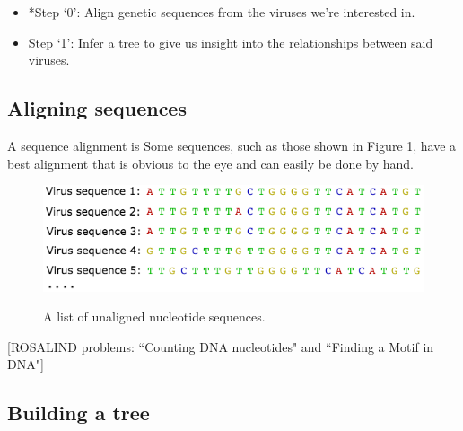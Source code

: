\documentclass{scrartcl}
\begin{document}
\begin{itemize}
	\item *Step `0':  Align genetic sequences from the viruses we're interested in.
	\item \hspace{0.5mm} Step `1':  Infer a tree to give us insight into the relationships between said viruses.
\end{itemize}



\subsection{Aligning sequences}

A sequence alignment is
Some sequences, such as those shown in Figure 1, have a best alignment that is obvious to the eye and can easily be done by hand.

\begin{figure}[H] 
\center
{\includegraphics[width=0.7\linewidth]{FluSequence0.png}}
\caption{A list of unaligned nucleotide sequences.}
\label{sequences}
\end{figure}

\vspace{2mm}

\vspace{2mm}

\vspace{2mm}
[ROSALIND problems:  ``Counting DNA nucleotides" and ``Finding a Motif in DNA"]

\subsection{Building a tree}
\end{document}
